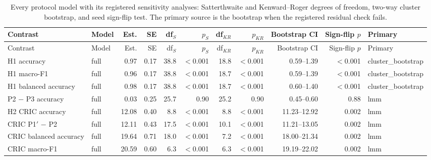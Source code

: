 {\scriptsize
\setlength{\tabcolsep}{3.5pt}
\begin{longtable}{llrrrrrrrrl}
\caption{Every protocol model with its registered sensitivity analyses: Satterthwaite and Kenward--Roger degrees of freedom, two-way cluster bootstrap, and seed sign-flip test. The primary source is the bootstrap when the registered residual check fails.}\label{r:tab:sensitivity}\\
\toprule
Contrast & Model & Est. & SE & df$_S$ & $p_S$ & df$_{KR}$ & $p_{KR}$ & Bootstrap CI & Sign-flip $p$ & Primary \\
\midrule
\endfirsthead
\toprule
Contrast & Model & Est. & SE & df$_S$ & $p_S$ & df$_{KR}$ & $p_{KR}$ & Bootstrap CI & Sign-flip $p$ & Primary \\
\midrule
\endhead
\bottomrule
\endfoot
H1 accuracy & full & 0.97 & 0.17 & 38.8 & $<$0.001 & 18.8 & $<$0.001 & 0.59--1.39 & $<$0.001 & cluster\_bootstrap \\
H1 macro-F1 & full & 0.96 & 0.17 & 38.8 & $<$0.001 & 18.7 & $<$0.001 & 0.59--1.39 & $<$0.001 & cluster\_bootstrap \\
H1 balanced accuracy & full & 0.98 & 0.17 & 38.8 & $<$0.001 & 18.7 & $<$0.001 & 0.60--1.40 & $<$0.001 & cluster\_bootstrap \\
P2 $-$ P3 accuracy & full & 0.03 & 0.25 & 25.7 & 0.90 & 25.2 & 0.90 & \textminus{}0.45--0.60 & 0.88 & lmm \\
H2 CRIC accuracy & full & 12.08 & 0.40 & 8.8 & $<$0.001 & 8.8 & $<$0.001 & 11.23--12.92 & 0.002 & lmm \\
CRIC P1$'$ $-$ P2 & full & 12.11 & 0.43 & 17.5 & $<$0.001 & 10.1 & $<$0.001 & 11.21--13.05 & 0.002 & lmm \\
CRIC balanced accuracy & full & 19.64 & 0.71 & 18.0 & $<$0.001 & 7.2 & $<$0.001 & 18.00--21.34 & 0.002 & lmm \\
CRIC macro-F1 & full & 20.59 & 0.60 & 6.3 & $<$0.001 & 6.3 & $<$0.001 & 19.19--22.02 & 0.002 & lmm \\
\end{longtable}
}
